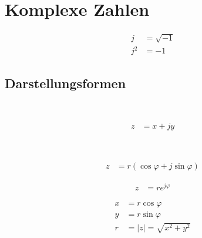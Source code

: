 \section{Komplexe Zahlen}
\begin{boxleft}
\end{boxleft}\begin{boxrightshaded}
 \begin{align} 
j&=\sqrt{-1}\\
j^2&=-1
\end{align}\end{boxrightshaded}

\subsection{Darstellungsformen}

\begin{boxleft}
  \\
\end{boxleft}\begin{boxrightshaded}
 \begin{align} 
z&=x+jy
\end{align}\end{boxrightshaded}

\begin{boxleft}
\\
\end{boxleft}\begin{boxrightshaded}
 \begin{align} 
z&=r\left(\cos{\varphi}+j\sin{\varphi}\right)
\end{align}\end{boxrightshaded}

\begin{boxleft}
\end{boxleft}\begin{boxrightshaded}
 \begin{align} 
z&=re^{j\varphi}
\end{align}\end{boxrightshaded}

\begin{boxleft}
\end{boxleft}\begin{boxrightshaded}
 \begin{align} 
x&=r\cos{\varphi}\\
y&=r\sin{\varphi}\\
r&=\left|z\right|=\sqrt{x^2+y^2}
\end{align}\end{boxrightshaded}

